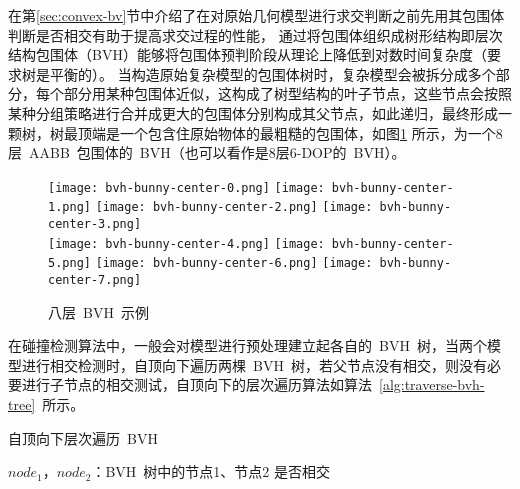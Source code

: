 在第\ref{sec:convex-bv}节中介绍了在对原始几何模型进行求交判断之前先用其包围体判断是否相交有助于提高求交过程的性能，
通过将包围体组织成树形结构即层次结构包围体（BVH）能够将包围体预判阶段从理论上降低到对数时间复杂度（要求树是平衡的）。
当构造原始复杂模型的包围体树时，复杂模型会被拆分成多个部分，每个部分用某种包围体近似，这构成了树型结构的叶子节点，这些节点会按照某种分组策略进行合并成更大的包围体分别构成其父节点，如此递归，最终形成一颗树，树最顶端是一个包含住原始物体的最粗糙的包围体，如图\ref{lbl:bvh-example}
所示，为一个8层~AABB~包围体的~BVH（也可以看作是8层6-DOP的~BVH）。
\begin{figure}[htbp]
  \centering
  \subcaptionbox*{\label{lbl:bvh-bunny-center-0.png}}
    {\texttt{[image: bvh-bunny-center-0.png]}}
  \subcaptionbox*{\label{lbl:bvh-bunny-center-1.png}}
    {\texttt{[image: bvh-bunny-center-1.png]}}
  \subcaptionbox*{\label{lbl:bvh-bunny-center-2.png}}
    {\texttt{[image: bvh-bunny-center-2.png]}}
  \subcaptionbox*{\label{lbl:bvh-bunny-center-3.png}}
    {\texttt{[image: bvh-bunny-center-3.png]}}
    \vspace{-0.3cm}
  \\\hspace{0.5cm} 
  \subcaptionbox*{\label{lbl:bvh-bunny-center-4.png}}
    {\texttt{[image: bvh-bunny-center-4.png]}}
  \subcaptionbox*{\label{lbl:bvh-bunny-center-5.png}}
    {\texttt{[image: bvh-bunny-center-5.png]}}
  \subcaptionbox*{\label{lbl:bvh-bunny-center-6.png}}
    {\texttt{[image: bvh-bunny-center-6.png]}}
  \subcaptionbox*{\label{lbl:bvh-bunny-center-7.png}}
    {\texttt{[image: bvh-bunny-center-7.png]}}
\caption{八层~BVH~示例}
\label{lbl:bvh-example}
\end{figure}

在碰撞检测算法中，一般会对模型进行预处理建立起各自的~BVH~树，当两个模型进行相交检测时，自顶向下遍历两棵~BVH~树，若父节点没有相交，则没有必要进行子节点的相交测试，自顶向下的层次遍历算法如算法~\ref{alg:traverse-bvh-tree}~所示。

\begin{algorithm}
\small
\caption{自顶向下层次遍历~BVH~}
\label{alg:traverse-bvh-tree}
\begin{algorithmic}[1]
\Require
$node_1$，$node_2$：BVH~树中的节点1、节点2
\Ensure
是否相交
    \State {} 
  \Else
               
           \Else
              \State {} 
              \EndFor
           \EndIf
      \Else
           \State {}  
           \EndFor
      \EndIf
  \EndIf
\EndFunction
\end{algorithmic}
\end{algorithm}

